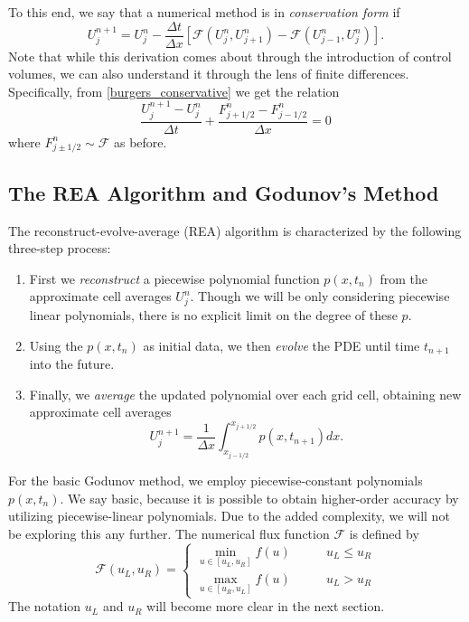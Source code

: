 \documentclass{myproject}
\begin{document}
To this end, we say that a numerical method is in \emph{conservation form} if 
\begin{equation}\label{conservation_form}
    U_j^{n+1} = U_j^n - \frac{\Delta t}{\Delta x} \left[ \mathcal{F}(U_{j}^{n}, U_{j+1}^{n}) - \mathcal{F}(U_{j-1}^{n}, U_{j}^{n}) \right].
\end{equation}
Note that while this derivation comes about through the introduction of control volumes, we can also understand it through the lens of finite differences. Specifically, from \eqref{burgers_conservative} we get the relation
\begin{equation}
    \frac{U_j^{n+1} - U_j^n}{\Delta t} + \frac{F_{j+1/2}^n - F_{j-1/2}^n}{\Delta x} = 0
\end{equation}
where $F_{j\pm1/2}^n \sim \mathcal{F}$ as before.

\subsection{The REA Algorithm and Godunov's Method}

The reconstruct-evolve-average (REA) algorithm is characterized by the following three-step process:
\begin{enumerate}
    \item
    First we \emph{reconstruct} a piecewise polynomial function $p(x,t_n)$ from the approximate cell averages $U_j^n$. Though we will be only considering piecewise linear polynomials, there is no explicit limit on the degree of these $p$.

    \item
    Using the $p(x,t_n)$ as initial data, we then \emph{evolve} the PDE until time $t_{n+1}$ into the future.

    \item
    Finally, we \emph{average} the updated polynomial over each grid cell, obtaining new approximate cell averages
    \begin{equation}
        U_j^{n+1} = \frac{1}{\Delta x} \int_{x_{j-1/2}}^{x_{j+1/2}} p(x,t_{n+1}) dx.
    \end{equation}
\end{enumerate}

For the basic Godunov method, we employ piecewise-constant polynomials $p(x,t_n)$. We say basic, because it is possible to obtain higher-order accuracy by utilizing piecewise-linear polynomials. Due to the added complexity, we will not be exploring this any further. The numerical flux function $\mathcal{F}$ is defined by
\begin{equation}
    \mathcal{F}(u_L, u_R) = \begin{cases}
        \min_{u \in [u_L,u_R]} f(u) \qquad & u_L \leq u_R \\
        \max_{u \in [u_R,u_L]} f(u) \qquad & u_L > u_R 
    \end{cases}
\end{equation}
The notation $u_L$ and $u_R$ will become more clear in the next section. 
\end{document}

